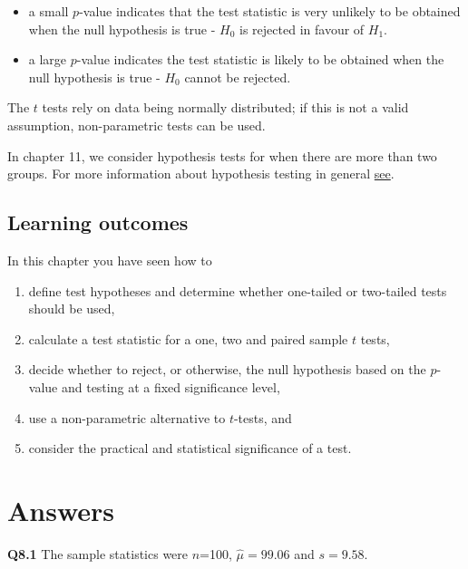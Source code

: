 \documentclass[
  oneside]{krantz}
\begin{document}
\begin{itemize}
\item
  a small \(p\)-value indicates that the test statistic is very unlikely to be obtained when the null hypothesis is true - \(H_0\) is rejected in favour of \(H_1\).
\item
  a large \(p\)-value indicates the test statistic is likely to be obtained when the null hypothesis is true - \(H_0\) cannot be rejected.
\end{itemize}

The \(t\) tests rely on data being normally distributed; if this is not a valid assumption, non-parametric tests can be used.

In chapter 11, we consider hypothesis tests for when there are more than two groups. For more information about hypothesis testing in general \href{https://www.khanacademy.org/math/probability/statistics-inferential/hypothesis-testing/v/hypothesis-testing-and-p-values}{see}.

\hypertarget{learning-outcomes-5}{%
\subsection{Learning outcomes}\label{learning-outcomes-5}}

In this chapter you have seen how to

\begin{enumerate}
\def\labelenumi{\arabic{enumi}.}
\item
  define test hypotheses and determine whether one-tailed or two-tailed tests should be used,
\item
  calculate a test statistic for a one, two and paired sample \(t\) tests,
\item
  decide whether to reject, or otherwise, the null hypothesis based on the \(p\)-value and testing at a fixed significance level,
\item
  use a non-parametric alternative to \(t\)-tests, and
\item
  consider the practical and statistical significance of a test.
\end{enumerate}

\hypertarget{ANShyp}{%
\section{Answers}\label{ANShyp}}

\textbf{Q8.1} The sample statistics were \(n\)=100, \(\hat \mu = 99.06\) and \(s=9.58\).
\end{document}
